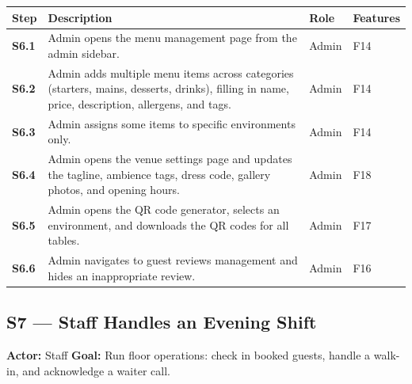 \documentclass[12pt,a4paper]{article}
\begin{document}
\begin{longtable}{>{\bfseries}l L{6.5cm} l L{3cm}}
    \toprule
    Step & Description & Role & Features \\
    \midrule
    S6.1 & Admin opens the menu management page from the admin sidebar. & Admin & F14 \\
    S6.2 & Admin adds multiple menu items across categories (starters,
           mains, desserts, drinks), filling in name, price,
           description, allergens, and tags. & Admin & F14 \\
    S6.3 & Admin assigns some items to specific environments only. & Admin & F14 \\
    S6.4 & Admin opens the venue settings page and updates the tagline,
           ambience tags, dress code, gallery photos, and opening hours. & Admin & F18 \\
    S6.5 & Admin opens the QR code generator, selects an environment,
           and downloads the QR codes for all tables. & Admin & F17 \\
    S6.6 & Admin navigates to guest reviews management and hides an
           inappropriate review. & Admin & F16 \\
    \bottomrule
\end{longtable}

\subsection*{S7 --- Staff Handles an Evening Shift}
\begin{mdframed}[style=scenariobox]
\textbf{Actor:} Staff \quad
\textbf{Goal:} Run floor operations: check in booked guests, handle a
walk-in, and acknowledge a waiter call.
\end{mdframed}
\end{document}
